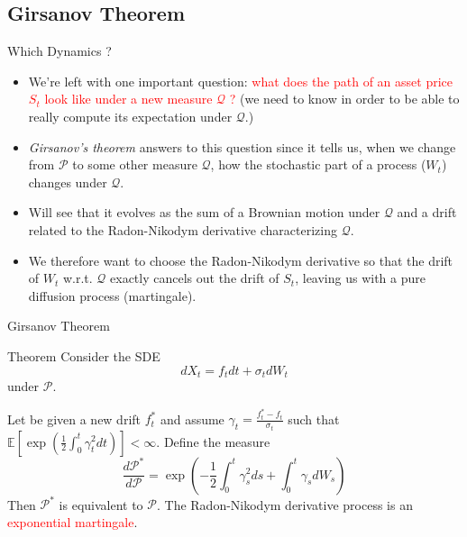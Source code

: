 \documentclass{beamer}
\begin{document}
\subsection{Girsanov Theorem}
\begin{frame}{Which Dynamics ?}
  \begin{itemize}
  \item<1-> We're left with one important question:
    \textcolor{red}{what does the path of an asset price $S_t$ look like under a new measure $\mathcal{Q}$ ?} (we need to know in order to be able to really compute its expectation under $\mathcal{Q}$.)
  \item<2-> \emph{Girsanov's theorem} answers to this question since it tells us, when we change from $\mathcal{P}$ to some other measure $\mathcal{Q}$, how the stochastic part of a process ($W_t$) changes under $\mathcal{Q}$.
  \item<3-> Will see that it evolves as the sum of a Brownian motion under $\mathcal{Q}$ and a drift related to the Radon-Nikodym derivative characterizing $\mathcal{Q}$.
  \item<4-> We therefore want to choose the Radon-Nikodym derivative so that the drift of $W_t$ w.r.t. $\mathcal{Q}$ exactly cancels out the drift of $S_t$, leaving us with a pure diffusion process (martingale). 
  \end{itemize}
\end{frame}

\begin{frame}{Girsanov Theorem}
  \begin{block}{Theorem}
    Consider the SDE 
    \begin{equation*}
      dX_t = f_t dt + \sigma_t dW_t
    \end{equation*}
    under $\mathcal{P}$. 
    
    Let be given a new drift $f^*_t$ and assume $\gamma_t=\frac{f_t^*-f_t}{\sigma_t}$ such that $\mathbb{E}\left[\exp\left(\frac{1}{2}\int_0^t\gamma_t^2dt\right)\right]<\infty$.
    Define the measure 
    \begin{equation}
      \frac{d\mathcal{P}^*}{d\mathcal{P}}=\exp\left(-\frac{1}{2}\int_0^t \gamma_s^2 ds + \int_0^t \gamma_s dW_s \right)
    \end{equation}
    Then $\mathcal{P}^*$ is equivalent to $\mathcal{P}$. 
    The Radon-Nikodym derivative process is an \textcolor{red}{exponential martingale}.
  \end{block}
\end{frame}
\end{document}

